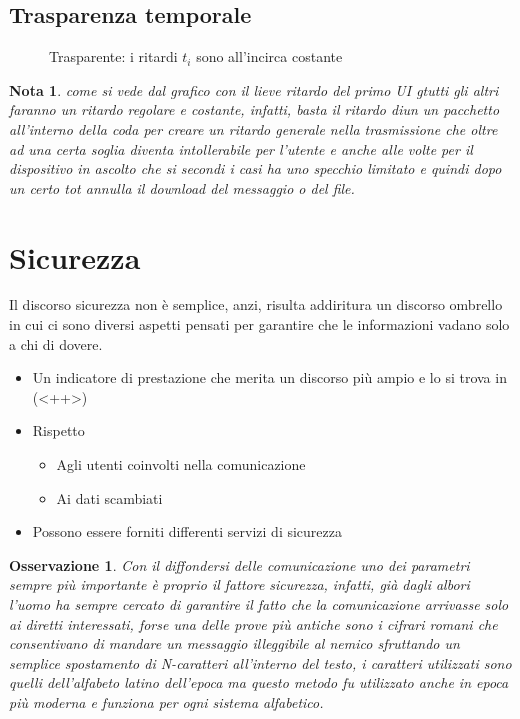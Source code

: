 \documentclass{book}
\newtheorem{nota}{Nota}[section]
\newtheorem{oss}{Osservazione}[section]
\begin{document}
\subsection{Trasparenza temporale}
\label{sec:trasptemp}
\begin{figure}[ht!]
  \centering
  \resizebox{6in}{!}{}
  \caption{Trasparente: i ritardi $t_i$ sono all'incirca costante}
  \label{fig:trasptemp}
\end{figure}
\begin{nota}
  come si vede dal grafico con il lieve ritardo del primo UI gtutti gli altri faranno un ritardo regolare e
  costante, infatti, basta il ritardo diun un pacchetto all'interno della coda per creare un ritardo generale
  nella trasmissione che oltre ad una certa soglia diventa intollerabile per l'utente e anche alle volte per
  il dispositivo in ascolto che si secondi i casi ha uno specchio limitato e quindi dopo un certo tot annulla
  il download del messaggio o del file.
\end{nota}
\section{Sicurezza}
\label{sec:sicurezza}
Il discorso sicurezza non è semplice, anzi, risulta addiritura un discorso ombrello in cui ci sono diversi
aspetti pensati per garantire che le informazioni vadano solo a chi di dovere.
\begin{itemize}
\item Un indicatore di prestazione che merita un discorso più ampio e lo si trova in (<++>)
\item Rispetto
  \begin{itemize}
  \item Agli utenti coinvolti nella comunicazione
  \item Ai dati scambiati
  \end{itemize}
\item Possono essere forniti differenti servizi di sicurezza
\end{itemize}
\clearpage
\begin{oss}
  Con il diffondersi delle comunicazione uno dei parametri sempre più importante è proprio il fattore sicurezza,
  infatti, già dagli albori l'uomo ha sempre cercato di garantire il fatto che la comunicazione arrivasse solo
  ai diretti interessati, forse una delle prove più antiche sono i cifrari romani che consentivano di mandare
  un messaggio illeggibile al nemico sfruttando un semplice spostamento di N-caratteri all'interno del testo,
  i caratteri utilizzati sono quelli dell'alfabeto latino dell'epoca ma questo metodo fu utilizzato anche in epoca
  più moderna e funziona per ogni sistema alfabetico. 
\end{oss}
\end{document}
